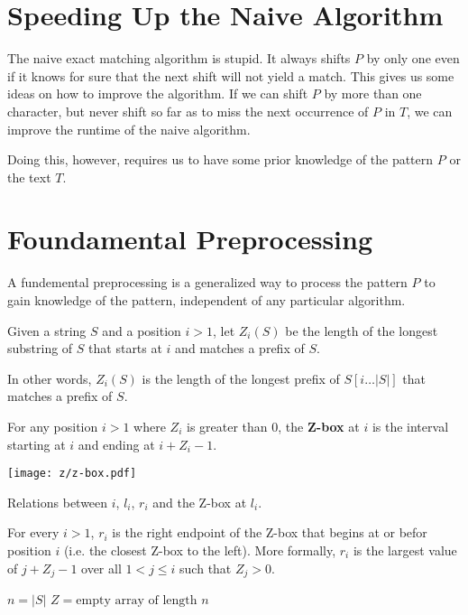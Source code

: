 \section{Speeding Up the Naive Algorithm}

The naive exact matching algorithm is stupid. It always shifts $P$ by only one even if it knows for sure that the next shift will not yield a match. This gives us some ideas on how to improve the algorithm. If we can shift $P$ by more than one character, but never shift so far as to miss the next occurrence of $P$ in $T$, we can improve the runtime of the naive algorithm.

Doing this, however, requires us to have some prior knowledge of the pattern $P$ or the text $T$.

\section{Foundamental Preprocessing}

A fundemental preprocessing is a generalized way to process the pattern $P$ to gain knowledge of the pattern, independent of any particular algorithm.

\begin{definition}
    Given a string $S$ and a position $i>1$, let $Z_i(S)$ be the length of the longest substring of $S$ that starts at $i$ and matches a prefix of $S$.

    In other words, $Z_i(S)$ is the length of the longest prefix of $S[i\ldots |S|]$ that matches a prefix of $S$.
\end{definition}

\begin{definition}[Z-box] 
    For any position $i > 1$ where $Z_i$ is greater than 0, the \textbf{Z-box} at $i$ is the interval starting at $i$ and ending at $i+Z_i-1$.
\end{definition}

\begin{marginfigure}
    \texttt{[image: z/z-box.pdf]}
    \caption{Relations between $i$, $l_i$, $r_i$ and the Z-box at $l_i$.}
    \label{fig:z-box}
\end{marginfigure}

\begin{definition}
    For every $i > 1$, $r_i$ is the right endpoint of the Z-box that begins at or befor position $i$ (i.e. the closest Z-box to the left). More formally, $r_i$ is the largest value of $j + Z_j - 1$ over all $1 < j \leq i$ such that $Z_j > 0$.
\end{definition}

\begin{codebox}
    \li $n = |S|$
    \li $Z = \text{empty array of length $n$}$ 
\end{codebox}